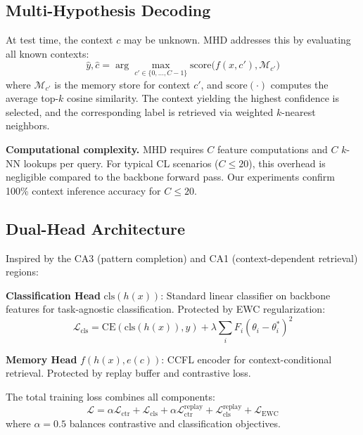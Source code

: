 \documentclass[letterpaper, 10pt, times]{article}
\begin{document}
\subsection{Multi-Hypothesis Decoding}

At test time, the context $c$ may be unknown. MHD addresses this by evaluating all known contexts:
\begin{equation}
\hat{y}, \hat{c} = \arg\max_{c' \in \{0,\ldots,C-1\}} \text{score}\big(f(x, c'), \mathcal{M}_{c'}\big)
\end{equation}
where $\mathcal{M}_{c'}$ is the memory store for context $c'$, and $\text{score}(\cdot)$ computes the average top-$k$ cosine similarity. The context yielding the highest confidence is selected, and the corresponding label is retrieved via weighted $k$-nearest neighbors.

\textbf{Computational complexity.} MHD requires $C$ feature computations and $C$ $k$-NN lookups per query. For typical CL scenarios ($C \leq 20$), this overhead is negligible compared to the backbone forward pass. Our experiments confirm 100\% context inference accuracy for $C \leq 20$.

\subsection{Dual-Head Architecture}

Inspired by the CA3 (pattern completion) and CA1 (context-dependent retrieval) regions:

\textbf{Classification Head} $\text{cls}(h(x))$: Standard linear classifier on backbone features for task-agnostic classification. Protected by EWC regularization:
\begin{equation}
\mathcal{L}_{\text{cls}} = \text{CE}(\text{cls}(h(x)), y) + \lambda \sum_i F_i (\theta_i - \theta_i^*)^2
\end{equation}

\textbf{Memory Head} $f(h(x), e(c))$: CCFL encoder for context-conditional retrieval. Protected by replay buffer and contrastive loss.

The total training loss combines all components:
\begin{equation}
\mathcal{L} = \alpha \mathcal{L}_{\text{ctr}} + \mathcal{L}_{\text{cls}} + \alpha \mathcal{L}_{\text{ctr}}^{\text{replay}} + \mathcal{L}_{\text{cls}}^{\text{replay}} + \mathcal{L}_{\text{EWC}}
\end{equation}
where $\alpha = 0.5$ balances contrastive and classification objectives.
\end{document}
